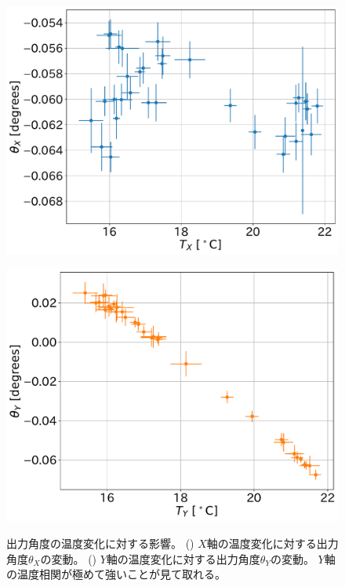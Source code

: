 \documentclass[../../main.tex]{subfiles}
\begin{document}
\begin{figure}[H]
    \begin{minipage}[b]{0.49\columnwidth}
        \centering
        \includegraphics[width=0.985\columnwidth]{tiltsensor/timedrift_angleX_tempX.pdf}
        \subcaption{}
        \label{fig:timedrift_angleX_tempcorr}
    \end{minipage}
    \hspace{2mm}
    \begin{minipage}[b]{0.49\columnwidth}
        \centering
        \includegraphics[width=0.985\columnwidth]{tiltsensor/timedrift_angleY_tempY.pdf}
        \subcaption{}
        \label{fig:timedrift_angleY_tempcorr}
    \end{minipage}
    \caption{出力角度の温度変化に対する影響。
    () $X$軸の温度変化に対する出力角度$\theta_{X}$の変動。
    () $Y$軸の温度変化に対する出力角度$\theta_{Y}$の変動。
    $Y$軸の温度相関が極めて強いことが見て取れる。}
    \label{fig:timedrift_tempcorr}
\end{figure}
\end{document}
